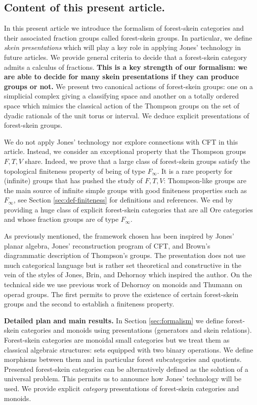 \documentclass[a4paper, 12pt]{amsart}
\numberwithin{equation}{section}
\theoremstyle{definition}
\begin{document}
\subsection*{Content of this present article.}
In this present article we introduce the formalism of forest-skein categories and their associated fraction groups called forest-skein groups.
In particular, we define {\it skein presentations} which will play a key role in applying Jones' technology in future articles.
We provide general criteria to decide that a forest-skein category admits a calculus of fractions.  
{\bf This is a key strength of our formalism: we are able to decide for many skein presentations if they can produce groups or not.}
We present two canonical actions of forest-skein groups: one on a simplicial complex giving a classifying space and another on a totally ordered space which mimics the classical action of the Thompson groups on the set of dyadic rationals of the unit torus or interval.
We deduce explicit presentations of forest-skein groups.

We do not apply Jones' technology nor explore connections with CFT in this article. 
Instead, we consider an exceptional property that the Thompson groups $F,T,V$ share. 
Indeed, we prove that a large class of forest-skein groups satisfy the topological finiteness property of being of type $F_\infty$.
It is a rare property for (infinite) groups that has pushed the study of $F,T,V$: Thompson-like groups are the main source of infinite simple groups with good finiteness properties such as $F_\infty$, see Section \ref{sec:def-finiteness} for definitions and references.
We end by providing a huge class of explicit forest-skein categories that are all Ore categories and whose fraction groups are of type $F_\infty$. 

As previously mentioned, the framework chosen has been inspired by Jones' planar algebra, Jones' reconstruction program of CFT, and Brown's diagrammatic description of Thompson's groups. 
The presentation does not use much categorical language but is rather set theoretical and constructive in the vein of the styles of Jones, Brin, and Dehornoy which inspired the author.
On the technical side we use previous work of Dehornoy on monoids and Thumann on operad groups.
The first permits to prove the existence of certain forest-skein groups and the second to establish a finiteness property.

{\bf Detailed plan and main results.}
In Section \ref{sec:formalism} we define forest-skein categories and monoids using presentations (generators and skein relations).
Forest-skein categories are monoidal small categories but we treat them as classical algebraic structures: sets equipped with two binary operations.
We define morphisms between them and in particular forest subcategories and quotients. 
Presented forest-skein categories can be alternatively defined as the solution of a universal problem.
This permits us to announce how Jones' technology will be used.
We provide explicit {\it category} presentations of forest-skein categories and monoids.
\end{document}
